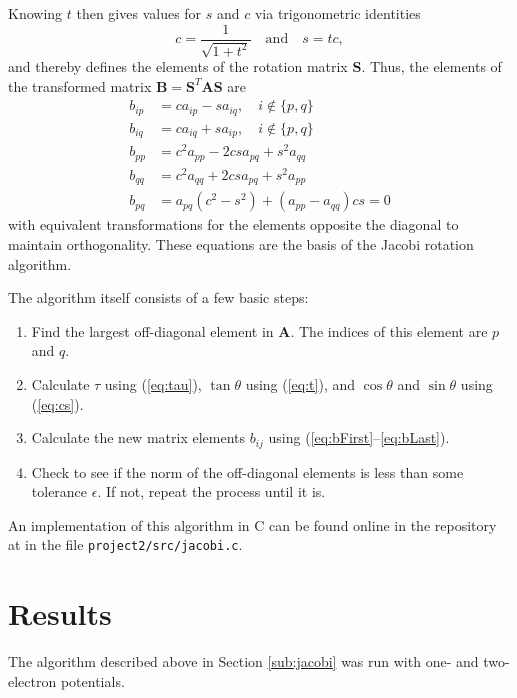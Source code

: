 \documentclass[aps,prc,reprint]{revtex4-1}
\begin{document}
        Knowing $t$ then gives values for $s$ and $c$ via trigonometric identities
        \begin{equation}
            c = \frac{1}{\sqrt{1 + t^2}} \quad \text{and}\quad s = tc, \label{eq:cs}
        \end{equation}
        and thereby defines the elements of the rotation matrix $\mathbf{S}$. Thus, the elements of the transformed matrix $\mathbf{B} = \mathbf{S}^T \mathbf{A} \mathbf{S}$ are
        \begin{align}
            b_{ip} &= ca_{ip} - sa_{iq}, \quad i \notin \{p, q\} \label{eq:bFirst}\\
            b_{iq} &= ca_{iq} + sa_{ip}, \quad i \notin \{p, q\} \\
            b_{pp} &= c^2 a_{pp} - 2csa_{pq} + s^2 a_{qq} \\
            b_{qq} &= c^2 a_{qq} + 2csa_{pq} + s^2 a_{pp} \\
            b_{pq} &= a_{pq}(c^2-s^2) + (a_{pp} - a_{qq}) cs = 0 \label{eq:bLast}
        \end{align}
        with equivalent transformations for the elements opposite the diagonal to maintain orthogonality. These equations are the basis of the Jacobi rotation algorithm.

        The algorithm itself consists of a few basic steps:
        \begin{enumerate}
            \item Find the largest off-diagonal element in $\mathbf{A}$. The indices of this element are $p$ and $q$.
            \item Calculate $\tau$ using (\ref{eq:tau}), $\tan\theta$ using (\ref{eq:t}), and $\cos\theta$ and $\sin\theta$ using (\ref{eq:cs}).
            \item Calculate the new matrix elements $b_{ij}$ using (\ref{eq:bFirst}--\ref{eq:bLast}).
            \item Check to see if the norm of the off-diagonal elements is less than some tolerance $\epsilon$. If not, repeat the process until it is.
        \end{enumerate}
        An implementation of this algorithm in C can be found online in the repository at \cite{github} in the file \texttt{project2/src/jacobi.c}.

\section{Results}
\label{sec:results}
    The algorithm described above in Section \ref{sub:jacobi} was run with one- and two-electron potentials.
\end{document}
